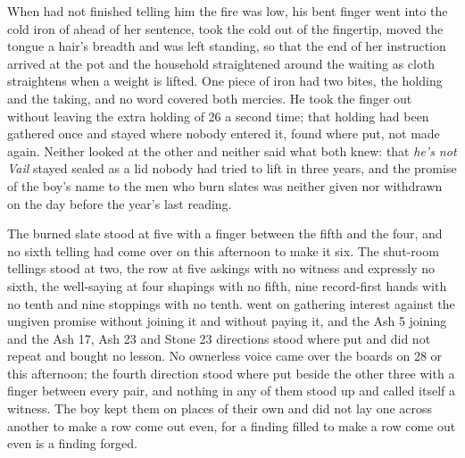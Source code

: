When  had not finished telling him the fire was low, his bent finger went into the cold iron of  ahead of her sentence, took the cold out of the fingertip, moved the tongue a hair's breadth and was left standing, so that the end of her instruction arrived at the pot and the household straightened around the waiting as cloth straightens when a weight is lifted. One piece of iron had two bites, the holding and the taking, and no  word covered both mercies. He took the finger out without leaving the extra holding of  26 a second time; that holding had been gathered once and stayed where nobody entered it, found where put, not made again. Neither looked at the other and neither said what both knew: that \emph{he's not Vail} stayed sealed as a lid nobody had tried to lift in three years, and the promise of the boy's name to the men who burn slates was neither given nor withdrawn on the day before the year's last reading.

The burned slate stood at five with a finger between the fifth and the four, and no sixth telling had come over  on this afternoon to make it six. The shut-room tellings stood at two, the row at five askings with no witness and expressly no sixth, the well-saying at four shapings with no fifth, nine record-first hands with no tenth and nine stoppings with no tenth.  went on gathering interest against the ungiven promise without joining it and without paying it, and the Ash 5 joining and the Ash 17, Ash 23 and Stone 23 directions stood where put and did not repeat and bought no lesson. No ownerless voice came over the boards on  28 or this afternoon; the fourth direction stood where put beside the other three with a finger between every pair, and nothing in any of them stood up and called itself a witness. The boy kept them on places of their own and did not lay one across another to make a row come out even, for a finding filled to make a row come out even is a finding forged.


